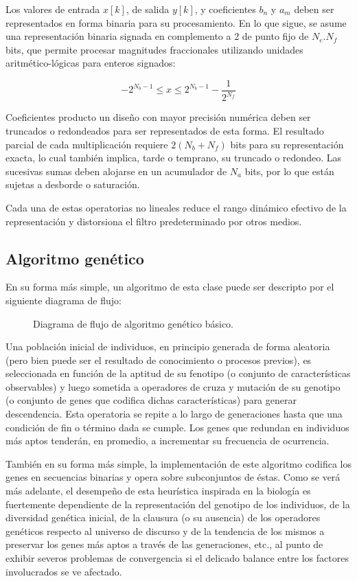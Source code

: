 \documentclass[11pt, journal]{IEEEtran}
\begin{document}
Los valores de entrada \(x[k]\), de salida \(y[k]\), y coeficientes
\(b_n\) y \(a_m\) deben ser representados en forma binaria para su
procesamiento. En lo que sigue, se asume una representación binaria
signada en complemento a 2 de punto fijo de \(N_e.N_f\) bits, que
permite procesar magnitudes fraccionales utilizando unidades
aritmético-lógicas para enteros signados:

\[ -2^{N_b-1} \leq x \leq 2^{N_b-1}-\frac{1}{2^{N_f}} \]

Coeficientes producto un diseño con mayor precisión numérica deben ser
truncados o redondeados para ser representados de esta forma. El
resultado parcial de cada multiplicación requiere \(2(N_b + N_f)\) bits
para su representación exacta, lo cual también implica, tarde o
temprano, su truncado o redondeo. Las sucesivas sumas deben alojarse en
un acumulador de \(N_a\) bits, por lo que están sujetas a desborde o
saturación.

Cada una de estas operatorias no lineales reduce el rango dinámico
efectivo de la representación y distorsiona el filtro predeterminado por
otros medios.

\newpage

\subsection{Algoritmo genético}

En su forma más simple, un algoritmo de esta clase puede ser descripto
por el siguiente diagrama de flujo:

\begin{figure}
  \centering
  \caption{Diagrama de flujo de algoritmo genético básico.}
\end{figure}

Una población inicial de individuos, en principio generada de forma
aleatoria (pero bien puede ser el resultado de conocimiento o procesos
previos), es seleccionada en función de la aptitud de su fenotipo (o
conjunto de características observables) y luego sometida a operadores
de cruza y mutación de su genotipo (o conjunto de genes que codifica
dichas características) para generar descendencia. Esta operatoria se
repite a lo largo de generaciones hasta que una condición de fin o
término dada se cumple. Los genes que redundan en individuos más aptos
tenderán, en promedio, a incrementar su frecuencia de ocurrencia.

También en su forma más simple, la implementación de este algoritmo
codifica los genes en secuencias binarias y opera sobre subconjuntos de
éstas. Como se verá más adelante, el desempeño de esta heurística
inspirada en la biología es fuertemente dependiente de la representación
del genotipo de los individuos, de la diversidad genética inicial, de la
clausura (o su ausencia) de los operadores genéticos respecto al
universo de discurso y de la tendencia de los mismos a preservar los
genes más aptos a través de las generaciones, etc., al punto de exhibir
severos problemas de convergencia si el delicado balance entre los
factores involucrados se ve afectado.
\end{document}
